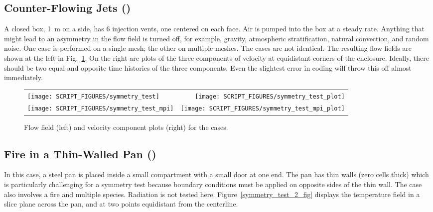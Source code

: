 \documentclass[11pt]{book}
\begin{document}
\subsection{Counter-Flowing Jets (\texorpdfstring{}{symmetry\_test})}
\label{symmetry_test}
\label{symmetry_test_mpi}

A closed box, 1~m on a side, has 6 injection vents, one centered on each face. Air is pumped into the box at a steady rate. Anything that might lead to an asymmetry in the flow field is turned off, for example, gravity, atmospheric stratification, natural convection, and random noise. One case is performed on a single mesh; the other on multiple meshes. The cases are not identical. The resulting flow fields are shown at the left in Fig.~\ref{symmetry_test_fig}. On the right are plots of the three components of velocity at equidistant corners of the enclosure. Ideally, there should be two equal and opposite time histories of the three components. Even the slightest error in coding will throw this off almost immediately.

\begin{figure}[!ht]
\begin{tabular*}{\textwidth}{lr}
\texttt{[image: SCRIPT\_FIGURES/symmetry\_test]} &
\texttt{[image: SCRIPT\_FIGURES/symmetry\_test\_plot]} \\
\texttt{[image: SCRIPT\_FIGURES/symmetry\_test\_mpi]} &
\texttt{[image: SCRIPT\_FIGURES/symmetry\_test\_mpi\_plot]}
\end{tabular*}
\caption[The  cases]{Flow field (left) and velocity component plots (right) for the  cases.}
\label{symmetry_test_fig}
\end{figure}

\subsection{Fire in a Thin-Walled Pan (\texorpdfstring{}{symmetry\_test\_2})}
\label{symmetry_test_2}

In this case, a steel pan is placed inside a small compartment with a small door at one end. The pan has thin walls (zero cells thick) which is particularly challenging for a symmetry test because boundary conditions must be applied on opposite sides of the thin wall. The case also involves a fire and multiple species. Radiation is not tested here. Figure~\ref{symmetry_test_2_fig} displays the temperature field in a slice plane across the pan, and at two points equidistant from the centerline.
\end{document}
